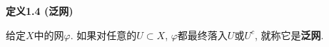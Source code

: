 \vspace{10pt}

\hypertarget{sec:定义1.4}{}
\noindent\textbf{定义1.4 (泛网)}

给定$X$中的网$\varphi$. 如果对任意的$U\subset X$,
$\varphi$都最终落入$U$或$U^c$, 就称它是\textbf{泛网}.










